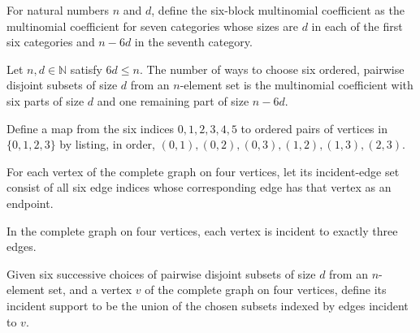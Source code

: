 \begin{definition}
\label{FABL.sixBlockMultinomial}
\leanok
For natural numbers $n$ and $d$, define the six-block multinomial coefficient as the
multinomial coefficient for seven categories whose sizes are $d$ in each of the first
six categories and $n-6d$ in the seventh category.
\end{definition}

\begin{theorem}
\label{FABL.natCard_sixDisjointBlockChoice_eq_multinomial}
\leanok
{}
Let $n,d\in\mathbb{N}$ satisfy $6d\le n$. The number of ways to choose six ordered,
pairwise disjoint subsets of size $d$ from an $n$-element set is the multinomial
coefficient with six parts of size $d$ and one remaining part of size $n-6d$.
\end{theorem}

\begin{definition}
\label{FABL.k4EdgeEnds}
\leanok
Define a map from the six indices $0,1,2,3,4,5$ to ordered pairs of vertices in
$\{0,1,2,3\}$ by listing, in order, $(0,1),(0,2),(0,3),(1,2),(1,3),(2,3)$.
\end{definition}

\begin{definition}
\label{FABL.k4IncidentEdges}
\leanok
{}
For each vertex of the complete graph on four vertices, let its incident-edge set
consist of all six edge indices whose corresponding edge has that vertex as an endpoint.
\end{definition}

\begin{theorem}
\label{FABL.card_k4IncidentEdges}
\leanok
{}
In the complete graph on four vertices, each vertex is incident to exactly three edges.
\end{theorem}

\begin{definition}
\label{FABL.SixDisjointBlockChoice.incidentSupport}
\leanok
{}
Given six successive choices of pairwise disjoint subsets of size $d$ from an
$n$-element set, and a vertex $v$ of the complete graph on four vertices, define its
incident support to be the union of the chosen subsets indexed by edges incident to $v$.
\end{definition}

